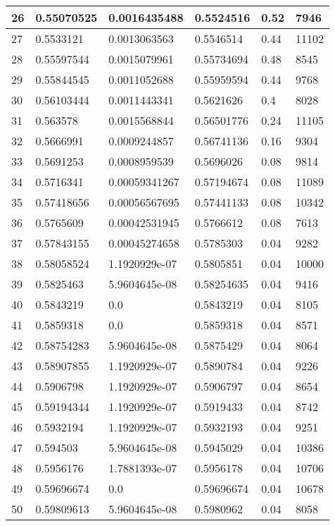 \begin{longtable}{|l|l|l|l|l|l|}
26 & 0.55070525 & 0.0016435488 & 0.5524516 & 0.52 & 7946 \\ \hline 
27 & 0.5533121 & 0.0013063563 & 0.5546514 & 0.44 & 11102 \\ \hline 
28 & 0.55597544 & 0.0015079961 & 0.55734694 & 0.48 & 8545 \\ \hline 
29 & 0.55844545 & 0.0011052688 & 0.55959594 & 0.44 & 9768 \\ \hline 
30 & 0.56103444 & 0.0011443341 & 0.5621626 & 0.4 & 8028 \\ \hline 
31 & 0.563578 & 0.0015568844 & 0.56501776 & 0.24 & 11105 \\ \hline 
32 & 0.5666991 & 0.0009244857 & 0.56741136 & 0.16 & 9304 \\ \hline 
33 & 0.5691253 & 0.0008959539 & 0.5696026 & 0.08 & 9814 \\ \hline 
34 & 0.5716341 & 0.00059341267 & 0.57194674 & 0.08 & 11089 \\ \hline 
35 & 0.57418656 & 0.00056567695 & 0.57441133 & 0.08 & 10342 \\ \hline 
36 & 0.5765609 & 0.00042531945 & 0.5766612 & 0.08 & 7613 \\ \hline 
37 & 0.57843155 & 0.00045274658 & 0.5785303 & 0.04 & 9282 \\ \hline 
38 & 0.58058524 & 1.1920929e-07 & 0.5805851 & 0.04 & 10000 \\ \hline 
39 & 0.5825463 & 5.9604645e-08 & 0.58254635 & 0.04 & 9416 \\ \hline 
40 & 0.5843219 & 0.0 & 0.5843219 & 0.04 & 8105 \\ \hline 
41 & 0.5859318 & 0.0 & 0.5859318 & 0.04 & 8571 \\ \hline 
42 & 0.58754283 & 5.9604645e-08 & 0.5875429 & 0.04 & 8064 \\ \hline 
43 & 0.58907855 & 1.1920929e-07 & 0.5890784 & 0.04 & 9226 \\ \hline 
44 & 0.5906798 & 1.1920929e-07 & 0.5906797 & 0.04 & 8654 \\ \hline 
45 & 0.59194344 & 1.1920929e-07 & 0.5919433 & 0.04 & 8742 \\ \hline 
46 & 0.5932194 & 1.1920929e-07 & 0.5932193 & 0.04 & 9251 \\ \hline 
47 & 0.594503 & 5.9604645e-08 & 0.5945029 & 0.04 & 10386 \\ \hline 
48 & 0.5956176 & 1.7881393e-07 & 0.5956178 & 0.04 & 10706 \\ \hline 
49 & 0.59696674 & 0.0 & 0.59696674 & 0.04 & 10678 \\ \hline 
50 & 0.59809613 & 5.9604645e-08 & 0.5980962 & 0.04 & 8058 \\ \hline 

\end{longtable}
